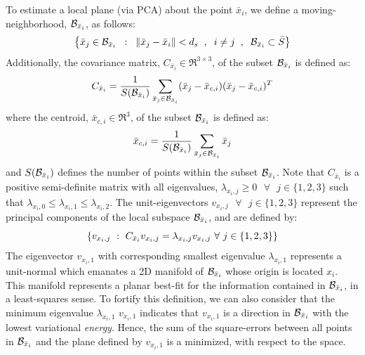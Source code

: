 		To estimate a local plane (via PCA) about the point $\bar{x}_{i}$, we define a moving-neighborhood, ${\cal B}_{\bar{x}_{i}}$, as follows:
			\newcommand{\xball}{\mmathcal{B}_{\bar{x}_{i}}}
			\begin{equation}
				\setwrap{ \bar{x}_{j} \in \xball \SSep : \SSep \norm{\bar{x}_{j}-\bar{x}_{i}} < d_{s}\SSep , \SSep i\neq j \SSep , \SSep \xball \subset \bar{S}}
				\label{eq::pca_ball}
			\end{equation}
		Additionally, the covariance matrix, $C_{\bar{x}_{i}} \in \Re^{3\times3}$, of the subset $\xball$ is defined as:
			\begin{equation}
				C_{\bar{x}_{i}} =
				\frac{1}{S(\xball)} \sum_{\bar{x}_{j} \in \xball } ( \bar{x}_{j} - \bar{x}_{c,i} ) ( \bar{x}_{j} - \bar{x}_{c,i} )^{T}
				\label{eq::pca_cov}
			\end{equation}
		where the centroid, $\bar{x}_{c,i} \in \Re^{3}$, of the subset $\xball$ is defined as:
			\begin{equation}
				\bar{x}_{c,i} = 
				\frac{1}{S(\xball)} \sum_{\bar{x}_{j} \in \xball } \bar{x}_{j}
				\label{eq::pca_centroid}
			\end{equation}
		and $S(\xball)$ defines the number of points within the subset $\xball$. Note that $C_{\bar{x}_{i}}$ is a positive semi-definite matrix with all eigenvalues, $\lambda_{x_{i},j}\geq0\text{ }\forall\text{ }j\in\{1,2,3\}$ such that $\lambda_{x_{i},0}\leq\lambda_{x_{i},1}\leq\lambda_{x_{i},2}$. The unit-eigenvectors $v_{x_{i},j} \text{ }\forall\text{ }j\in\{1,2,3\}$ represent the principal components of the local subspace $\xball$, and are defined by:
			\begin{equation}
				\left\{ v_{x_{i},j}\text{ }:\text{ }C_{\bar{x}_{i}} v_{x_{i},j} = \lambda_{x_{i},j} v_{x_{i},j}\text{ }\forall\text{ }j\in\{1,2,3\}\right\}
				\label{eq::pca_eigen}
			\end{equation}
		The eigenvector $v_{x_{i},1}$ with corresponding smallest eigenvalue $\lambda_{x_{i},1}$ represents a unit-normal which emanates a 2D manifold of $\xball$ whose origin is located $x_{i}$. This manifold represents a planar best-fit for the information contained in $\xball$, in a least-squares sense. To fortify this definition, we can also consider that the minimum eigenvalue $\lambda_{x_{i},1}$ $v_{x_{i},1}$ indicates that $v_{x_{i},1}$ is a direction in $\xball$ with the lowest variational \emph{energy}. Hence, the sum of the square-errors between all points in $\xball$ and the plane defined by $v_{x_{i},1}$ is a minimized, with respect to the space.

